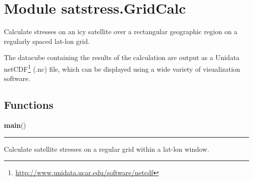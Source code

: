 %
%
%


\section{Module satstress.GridCalc}

    \label{satstress:GridCalc}
Calculate stresses on an icy satellite over a rectangular geographic region
on a regularly spaced lat-lon grid.

The datacube containing the results of the calculation are output as a 
Unidata 
netCDF\footnote{\href{http://www.unidata.ucar.edu/software/netcdf}{http://www.unidata.ucar.edu/software/netcdf}}
(.nc) file, which can be displayed using a wide variety of visualization 
software.



  \subsection{Functions}

    \label{satstress:GridCalc:main}

    \vspace{0.5ex}

\hspace{.8\funcindent}\begin{boxedminipage}{\funcwidth}

    \raggedright \textbf{main}()

    \vspace{-1.5ex}

    \rule{\textwidth}{0.5\fboxrule}
\setlength{\parskip}{2ex}
    Calculate satellite stresses on a regular grid within a lat-lon window.

\setlength{\parskip}{1ex}
    \end{boxedminipage}


